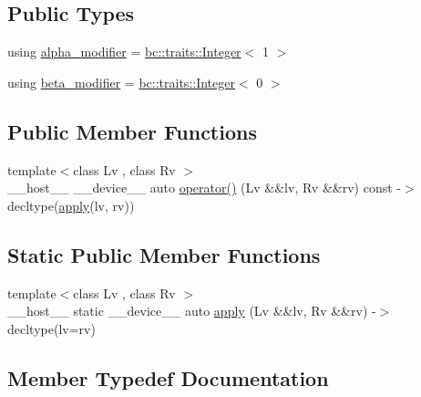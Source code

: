 \subsection*{Public Types}
\begin{DoxyCompactItemize}
\item 
using \hyperlink{structbc_1_1oper_1_1Alias__Assign_a5ae8d352adcc9c79c883b552bce7fb99}{alpha\+\_\+modifier} = \hyperlink{structbc_1_1traits_1_1Integer}{bc\+::traits\+::\+Integer}$<$ 1 $>$
\item 
using \hyperlink{structbc_1_1oper_1_1Alias__Assign_af1e9f3ff11a87bb8275be260d60f99e4}{beta\+\_\+modifier} = \hyperlink{structbc_1_1traits_1_1Integer}{bc\+::traits\+::\+Integer}$<$ 0 $>$
\end{DoxyCompactItemize}
\subsection*{Public Member Functions}
\begin{DoxyCompactItemize}
\item 
{\footnotesize template$<$class Lv , class Rv $>$ }\\\+\_\+\+\_\+host\+\_\+\+\_\+ \+\_\+\+\_\+device\+\_\+\+\_\+ auto \hyperlink{structbc_1_1oper_1_1Alias__Assign_aeb048124a57b7e7ad877cf5abbfc3162}{operator()} (Lv \&\&lv, Rv \&\&rv) const -\/$>$ decltype(\hyperlink{structbc_1_1oper_1_1Alias__Assign_ae64d52d432b301777f6e22cd57eb67b0}{apply}(lv, rv))
\end{DoxyCompactItemize}
\subsection*{Static Public Member Functions}
\begin{DoxyCompactItemize}
\item 
{\footnotesize template$<$class Lv , class Rv $>$ }\\\+\_\+\+\_\+host\+\_\+\+\_\+ static \+\_\+\+\_\+device\+\_\+\+\_\+ auto \hyperlink{structbc_1_1oper_1_1Alias__Assign_ae64d52d432b301777f6e22cd57eb67b0}{apply} (Lv \&\&lv, Rv \&\&rv) -\/$>$ decltype(lv=rv)
\end{DoxyCompactItemize}


\subsection{Member Typedef Documentation}
\mbox{\label{structbc_1_1oper_1_1Alias__Assign_a5ae8d352adcc9c79c883b552bce7fb99}} 
